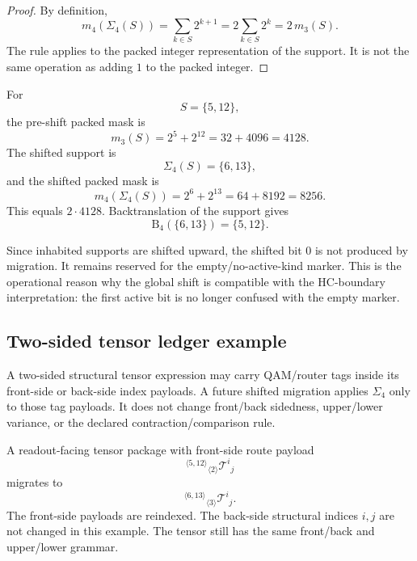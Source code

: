 \begin{proof}
By definition,
\[
 m_4(\Sigma_4(S))
 =
 \sum_{k\in S}2^{k+1}
 =
 2\sum_{k\in S}2^k
 =
 2\,m_3(S).
\]
The rule applies to the packed integer representation of the support. It is
not the same operation as adding $1$ to the packed integer.
\end{proof}

\begin{remark}
\label{rem:v3371-packed-mask-five-twelve-example}
For
\[
 S=\{5,12\},
\]
the pre-shift packed mask is
\[
 m_3(S)=2^5+2^{12}=32+4096=4128.
\]
The shifted support is
\[
 \Sigma_4(S)=\{6,13\},
\]
and the shifted packed mask is
\[
 m_4(\Sigma_4(S))=2^6+2^{13}=64+8192=8256.
\]
This equals $2\cdot 4128$. Backtranslation of the support gives
\[
 \mathrm B_4(\{6,13\})=\{5,12\}.
\]
\end{remark}

\begin{remark}
\label{rem:v3371-no-accidental-reserved-bit-activation}
Since inhabited supports are shifted upward, the shifted bit $0$ is not produced by
migration. It remains reserved for the empty/no-active-kind marker. This is
the operational reason why the global shift is compatible with the
HC-boundary interpretation: the first active bit is no longer confused with the
empty marker.
\end{remark}

\subsection{Two-sided tensor ledger example}
\label{subsec:v3371-two-sided-tensor-ledger-example}

\begin{definition}
\label{def:v3371-tensor-index-migration-ledger}
A two-sided structural tensor expression may carry QAM/router tags inside its
front-side or back-side index payloads. A future shifted migration applies
$\Sigma_4$ only to those tag payloads. It does not change front/back sidedness,
upper/lower variance, or the declared contraction/comparison rule.
\end{definition}

\begin{remark}
\label{rem:v3371-front-side-route-migration-example}
A readout-facing tensor package with front-side route payload
\[
 {}^{\langle 5,12\rangle}{}_{\langle 2\rangle}
 \mathcal T^{i}{}_{j}
\]
migrates to
\[
 {}^{\langle 6,13\rangle}{}_{\langle 3\rangle}
 \mathcal T^{i}{}_{j}.
\]
The front-side payloads are reindexed. The back-side structural indices
$i,j$ are not changed in this example. The tensor still has the same
front/back and upper/lower grammar.
\end{remark}

